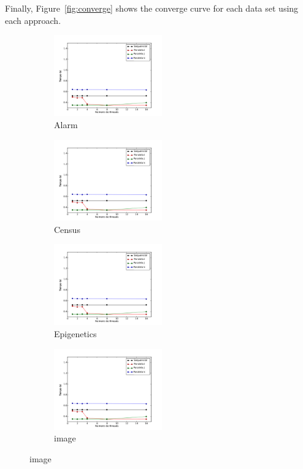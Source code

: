 	Finally, Figure~\ref{fig:converge} shows the converge curve for each data set using each approach.
	\begin{figure}[H]
		\centering
		\begin{subfigure}{.3\textwidth}
			\centering
			\includegraphics[height=3.5cm]{images/alarm}
			\caption{Alarm}
			\label{fig:alarm}
		\end{subfigure}
		\begin{subfigure}{.3\textwidth}
			\centering
			\includegraphics[height=3.5cm]{images/census}
			\caption{Census}
			\label{fig:census}
		\end{subfigure}
		\begin{subfigure}{.3\textwidth}
			\centering
			\includegraphics[height=3.5cm]{images/epigenetics}
			\caption{Epigenetics}
			\label{fig:epigenetics}
		\end{subfigure}
		\begin{subfigure}{.3\textwidth}
			\centering
			\includegraphics[height=3.5cm]{images/image}
			\caption{image}
			\label{fig:image}
		\end{subfigure}

\end{figure}
